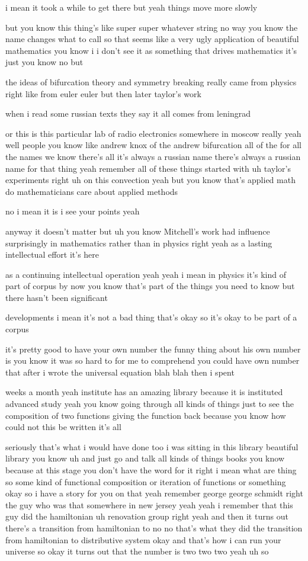 \begin{description}
i mean it took a while to get there but yeah things move more slowly

but you know this thing's like super super whatever string no way you know the name changes what to call so that seems like a very ugly application of beautiful mathematics you know i i don't see it as something that drives mathematics it's just you know no but

the ideas of bifurcation theory and symmetry breaking really came from physics right like from euler euler but then later taylor's work

when i read some russian texts they say it all comes from leningrad

or this is this particular lab of radio electronics somewhere in moscow really yeah well people you know like andrew knox of the andrew bifurcation all of the for all the names we know there's all it's always a russian name there's always a russian name for that thing yeah remember all of these things started with uh taylor's experiments right uh on this convection yeah but you know that's applied math do mathematicians care about applied methods

no i mean it is i see your points yeah

anyway it doesn't matter but uh you know Mitchell's work had influence surprisingly in mathematics rather than in physics right yeah as a lasting intellectual effort it's here

as a continuing intellectual operation yeah yeah i mean in physics it's kind of part of corpus by now you know that's part of the things you need to know but there hasn't been significant

developments i mean it's not a bad thing that's okay so it's okay to be part of a corpus

it's pretty good to have your own number the funny thing about his own number is you know it was so hard to for me to comprehend you could have own number that after i wrote the universal equation blah blah then i spent

weeks a month yeah institute has an amazing library because it is instituted advanced study yeah you know going through all kinds of things just to see the composition of two functions giving the function back because you know how could not this be written it's all

seriously that's what i would have done too i was sitting in this library beautiful library you know uh and just go and talk all kinds of things books you know because at this stage you don't have the word for it right i mean what are thing so some kind of functional composition or iteration of functions or something okay so i have a story for you on that yeah remember george george schmidt right the guy who was that somewhere in new jersey yeah yeah i remember that this guy did the hamiltonian uh renovation group right yeah and then it turns out there's a transition from hamiltonian to no no that's what they did the transition from hamiltonian to distributive system okay and that's how i can run your universe so okay it turns out that the number is two two two yeah uh so


\end{description}

